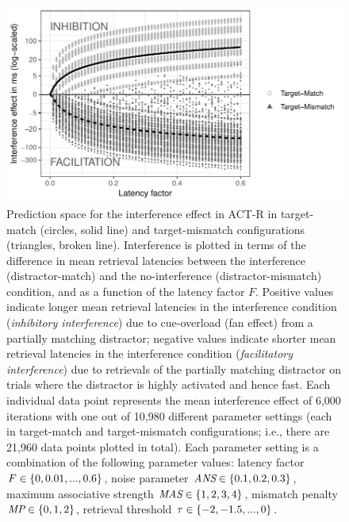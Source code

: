 \documentclass{cambridge7A}\usepackage[]{graphicx}\usepackage[]{color}
\begin{document}
\begin{figure}[htbp]
\centering
\includegraphics[width=.8\textwidth]{figures/fig-lv05plots1} 
\caption{Prediction space for the interference effect in ACT-R in target-match (circles, solid line) and target-mismatch configurations (triangles, broken line). Interference is plotted in terms of the difference in mean retrieval latencies between the interference (distractor-match) and the no-interference (distractor-mismatch) condition, and as a function of the latency factor $F$. Positive values indicate longer mean retrieval latencies in the interference condition (\emph{inhibitory interference}) due to cue-overload (fan effect) from a partially matching distractor; negative values indicate shorter mean retrieval latencies in the interference condition (\emph{facilitatory interference}) due to retrievals of the partially matching distractor on trials where the distractor is highly activated and hence fast. Each individual data point represents the mean interference effect of 6,000 iterations with one out of 10,980 different parameter settings (each in target-match and target-mismatch configurations; i.e., there are 21,960 data points plotted in total). Each parameter setting is a combination of the following parameter values: latency factor $\protect F \in \{0, 0.01, ..., 0.6\}$, noise parameter $\protect \textit{ANS} \in \{0.1, 0.2, 0.3\}$, maximum associative strength $\protect \textit{MAS} \in \{1,2,3,4\}$, mismatch penalty $\protect \textit{MP} \in \{0,1,2\}$, retrieval threshold $\protect \tau \in \{-2,-1.5,...,0\}$.}\label{fig:lv05plots}
\end{figure}
\end{document}
